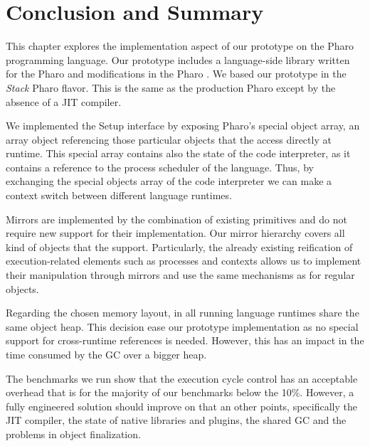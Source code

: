 \section{Conclusion and Summary}

This chapter explores the implementation aspect of our \Vtt prototype on the Pharo programming language. Our prototype includes a language-side library written for the Pharo and modifications in the Pharo \VM. We based our prototype in the \emph{Stack} Pharo \VM flavor. This \VM is the same as the production Pharo \VM except by the absence of a JIT compiler.

We implemented the \VM Setup interface by exposing Pharo's special object array, an array object referencing those particular objects that the \VM access directly at runtime. This special array contains also the state of the code interpreter, as it contains a reference to the process scheduler of the language. Thus, by exchanging the special objects array of the \VM code interpreter we can make a context switch between different language runtimes.

Mirrors are implemented by the combination of existing \VM primitives and do not require new \VM support for their implementation. Our mirror hierarchy covers all kind of objects that the \VM support. Particularly, the already existing reification of execution-related elements such as processes and contexts allows us to implement their manipulation through mirrors and use the same mechanisms as for regular objects.

Regarding the chosen memory layout, in \Vtt all running language runtimes share the same object heap. This decision ease our prototype implementation as no special support for cross-runtime references is needed. However, this has an impact in the time consumed by the GC over a bigger heap.

The benchmarks we run show that the execution cycle control has an acceptable overhead that is for the majority of our benchmarks below the 10\%. However, a fully engineered solution should improve on that an other points, specifically the JIT compiler, the state of native libraries and plugins, the shared GC and the problems in object finalization.


